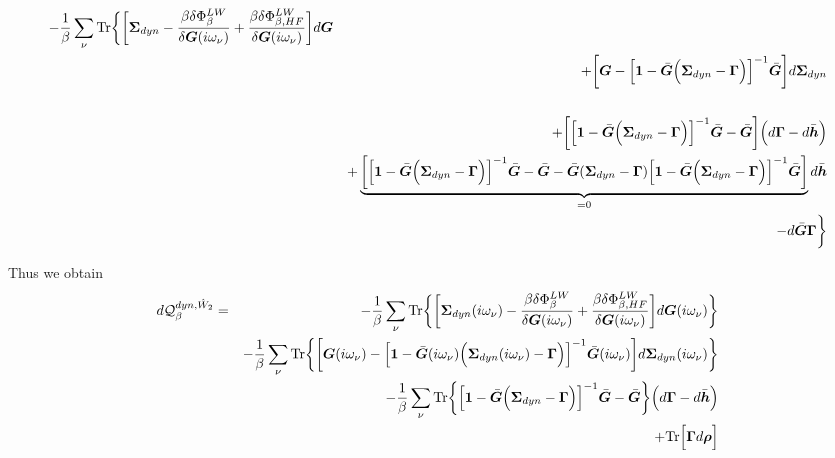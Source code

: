 \documentclass[11pt,a4paper]{report}
\begin{document}
\begin{eqnarray}
-\frac{1}{\beta}\sum_\nu\mathrm{Tr}\biggl\lbrace
\biggr[\bm{\Sigma}_{dyn}
-\frac{\beta\delta\Phi^{LW}_\beta}{\delta\bm{G}(i\omega_\nu)}
+\frac{\beta\delta\Phi^{LW}_{\beta,HF}}{\delta\bm{G}(i\omega_\nu)}
\biggr]d\bm{G}
\nonumber\\
&&+\biggl[
\bm{G}-\Bigl[\bm{1}-\bar{\bm{G}}
\Bigl(\bm{\Sigma}_{dyn}-\bm{\Gamma}\Bigr)\Bigr]^{-1}
\bar{\bm{G}}\biggr]d\bm{\Sigma}_{dyn}
\nonumber\\
&&
\nonumber\\
&&+\biggl[
\Bigl[\bm{1}-\bar{\bm{G}}
\Bigl(\bm{\Sigma}_{dyn}-\bm{\Gamma}\Bigr)\Bigr]^{-1}
\bar{\bm{G}}
-\bar{\bm{G}}
\biggr]\Bigl(d\bm{\Gamma}-d\bar{\bm{h}}\Bigr)
\nonumber\\
&&
+\underbrace{\biggl[
\Bigl[\bm{1}-\bar{\bm{G}}
\Bigl(\bm{\Sigma}_{dyn}-\bm{\Gamma}\Bigr)\Bigr]^{-1}
\bar{\bm{G}}
-\bar{\bm{G}}
-\bar{\bm{G}}(\bm{\Sigma}_{dyn}-\bm{\Gamma})
\Bigl[\bm{1}-\bar{\bm{G}}
\Bigl(\bm{\Sigma}_{dyn}-\bm{\Gamma}\Bigr)\Bigr]^{-1}
\bar{\bm{G}}
\biggr]}_{=0}d\bar{\bm{h}}
\nonumber\\
&&
-d\bar{\bm{G}}\bm{\Gamma}
\biggr\rbrace
\end{eqnarray}

Thus we obtain
\begin{eqnarray}
d\mathcal{Q}_{\beta}^{dyn,\hat{W}_2}
&=&
-\frac{1}{\beta}\sum_\nu\mathrm{Tr}\biggl\lbrace
\biggr[\bm{\Sigma}_{dyn}(i\omega_\nu)
-\frac{\beta\delta\Phi^{LW}_\beta}{\delta\bm{G}(i\omega_\nu)}
+\frac{\beta\delta\Phi^{LW}_{\beta,HF}}{\delta\bm{G}(i\omega_\nu)}
\biggr]d\bm{G}(i\omega_\nu)\biggr\rbrace
\nonumber\\
&&
-\frac{1}{\beta}\sum_\nu\mathrm{Tr}\biggl\lbrace
\biggl[
\bm{G}(i\omega_\nu)-\Bigl[\bm{1}-\bar{\bm{G}}(i\omega_\nu)
\Bigl(\bm{\Sigma}_{dyn}(i\omega_\nu)-\bm{\Gamma}\Bigr)\Bigr]^{-1}
\bar{\bm{G}}(i\omega_\nu)\biggr]d\bm{\Sigma}_{dyn}(i\omega_\nu)
\biggr\rbrace
\nonumber\\
&&
-\frac{1}{\beta}\sum_\nu\mathrm{Tr}\biggl\lbrace
\Bigl[\bm{1}-\bar{\bm{G}}
\Bigl(\bm{\Sigma}_{dyn}-\bm{\Gamma}\Bigr)\Bigr]^{-1}
\bar{\bm{G}}
-\bar{\bm{G}}
\biggr\rbrace
\Bigl(d\bm{\Gamma}-d\bar{\bm{h}}\Bigr)
\nonumber\\
&&+\mathrm{Tr}\Bigl[\bm{\Gamma}d\bm{\rho}\Bigr]
\end{eqnarray}
\end{document}
